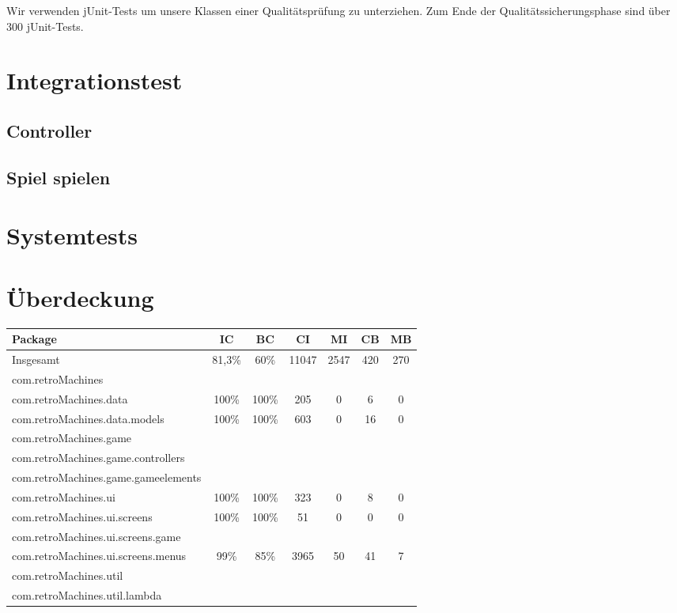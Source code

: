 \documentclass[parskip=full]{scrreprt}
\begin{document}
Wir verwenden jUnit-Tests um unsere Klassen einer Qualitätsprüfung zu unterziehen. Zum Ende der Qualitätssicherungsphase sind über 300 jUnit-Tests.

\chapter{Integrationstest}

\section{Controller}

\section{Spiel spielen}

\chapter{Systemtests}

\chapter{Überdeckung}

\begin{tabular} { | l | c | c | c | c | c | c | }
	\hline
	\textbf{Package} & \textbf{IC} & \textbf{BC} & \textbf{CI} & \textbf{MI} & \textbf{CB} & \textbf{MB} \\
	\hline
	Insgesamt & 81,3\% & 60\% & 11047 & 2547 & 420 & 270 \\
	\hline
	com.retroMachines \\
	\hline
	com.retroMachines.data & 100\% & 100\% & 205 & 0 & 6 & 0  \\
	\hline
	com.retroMachines.data.models & 100\% & 100\% & 603 & 0 & 16 & 0 \\
	\hline
	com.retroMachines.game \\
	\hline
	com.retroMachines.game.controllers \\
	\hline
	com.retroMachines.game.gameelements \\
	\hline
	com.retroMachines.ui & 100\% & 100\% & 323 & 0 & 8 & 0 \\
	\hline
	com.retroMachines.ui.screens & 100\% & 100\% & 51 & 0 & 0 & 0 \\
	\hline
	com.retroMachines.ui.screens.game \\
	\hline
	com.retroMachines.ui.screens.menus & 99\% & 85\% & 3965 & 50 & 41 & 7 \\
	\hline
	com.retroMachines.util \\
	\hline
	com.retroMachines.util.lambda \\
	\hline
\end{tabular}
\end{document}
